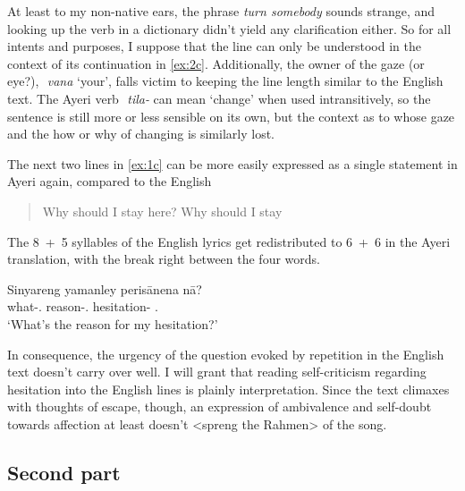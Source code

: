 \documentclass[12pt,paper=a4]{scrartcl}
\newcommand{\fw}[1]{\textit{#1}} %
\newcommand{\zwsp}{\mbox{​}} %
\newcommand{\rayr}[2]{\zwsp\smash{{\Tagati #1}} \emph{#2}} %
\newcommand{\xayr}[3]{\zwsp\smash{\Tagati #1} \emph{#2} `#3'} %
\begin{document}
At least to my non-native ears, the phrase \fw{turn somebody} sounds strange,
and looking up the verb in a dictionary didn't yield any clarification either.
So for all intents and purposes, I suppose that the line can only be understood
in the context of its continuation in \cref{ex:2c}. Additionally, the owner of
the gaze (or eye?), \xayr{vn}{vana}{your}, falls victim to keeping the line
length similar to the English text. The Ayeri verb \rayr{til/}{tila-} can mean
`change' when used intransitively, so the sentence is still more or less
sensible on its own, but the context as to whose gaze and the how or why of
changing is similarly lost.

The next two lines in \cref{ex:1c} can be more easily expressed as a single
statement in Ayeri again, compared to the English \blockquote{Why should I stay
here? Why should I stay}. The 8~+~5 syllables of the English lyrics get
redistributed to 6~+~6 in the Ayeri translation, with the break right between
the four words.

\begin{exe}
\ex \label{ex:1c}
	\gll Sinyareng yamanley perisānena nā? \\
		what-\Aarg.\Inan{} reason-\Parg.\Inan{} hesitation-\Gen{}
		\Fsg.\Gen{} \\
	\trans `What's the reason for my hesitation?'
\end{exe}

In consequence, the urgency of the question evoked by repetition in the English
text doesn't carry over well. I will grant that reading self-criticism
regarding hesitation into the English lines is plainly interpretation. Since
the text climaxes with thoughts of escape, though, an expression of ambivalence
and self-doubt towards affection at least doesn't <spreng the Rahmen> of the
song.

\subsection{Second part}
\end{document}
